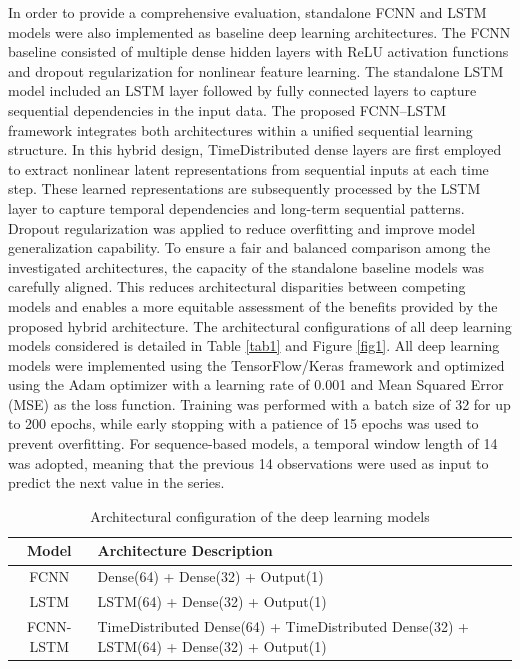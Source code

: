 \documentclass[twoside]{article}
\begin{document}
In order to provide a comprehensive evaluation, standalone FCNN and LSTM models were also implemented as baseline deep learning architectures. The FCNN baseline consisted of multiple dense hidden layers with ReLU activation functions and dropout regularization for nonlinear feature learning. The standalone LSTM model included an LSTM layer followed by fully connected layers to capture sequential dependencies in the input data. 
The proposed FCNN–LSTM framework integrates both architectures within a unified sequential learning structure. In this hybrid design, TimeDistributed dense layers are first employed to extract nonlinear latent representations from sequential inputs at each time step. These learned representations are subsequently processed by the LSTM layer to capture temporal dependencies and long-term sequential patterns. Dropout regularization was applied to reduce overfitting and improve model generalization capability. To ensure a fair and balanced comparison among the investigated architectures, the capacity of the standalone baseline models was carefully aligned. This reduces architectural disparities between competing models and enables a more equitable assessment of the benefits provided by the proposed hybrid architecture. The architectural configurations of all deep learning models considered is detailed in Table \ref{tab1} and Figure \ref{fig1}. All deep learning models were implemented using the TensorFlow/Keras framework and optimized using the Adam optimizer with a learning rate of 0.001 and Mean Squared Error (MSE) as the loss function. Training was performed with a batch size of 32 for up to 200 epochs, while early stopping with a patience of 15 epochs was used to prevent overfitting. For sequence-based models, a temporal window length of 14 was adopted, meaning that the previous 14 observations were used as input to predict the next value in the series.



\begin{table}[h]
\centering
\small
\caption{Architectural configuration of the deep learning models}\label{tab1}
\label{tab:architectures}

\begin{tabular}{|c|p{8cm}|}
\hline
Model & Architecture Description \\
\hline  \hline

FCNN & Dense(64) + Dense(32) + Output(1) \\
\hline

LSTM &LSTM(64) + Dense(32) + Output(1) \\
\hline

FCNN-LSTM &TimeDistributed Dense(64) + TimeDistributed Dense(32) + LSTM(64) + Dense(32) + Output(1) \\
\hline

\end{tabular}
\end{table}
\end{document}
